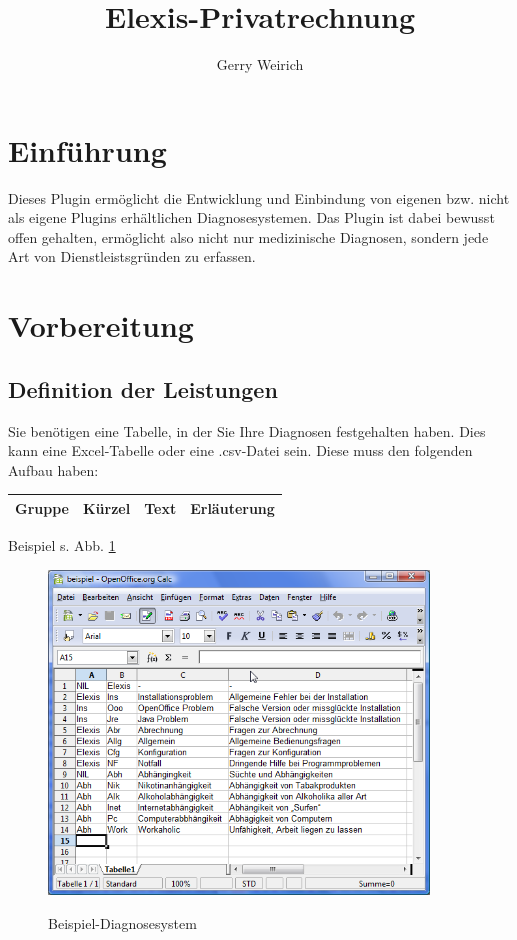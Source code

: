 \documentclass[a4paper]{scrartcl}
\begin{document}
\title{Elexis-Privatrechnung}
\author{Gerry Weirich}
\maketitle

\section{Einführung}
Dieses Plugin ermöglicht die Entwicklung und Einbindung von eigenen bzw. nicht als eigene Plugins erhältlichen Diagnosesystemen. Das Plugin ist dabei bewusst offen gehalten, ermöglicht also nicht nur medizinische Diagnosen, sondern jede Art von Dienstleistsgründen zu erfassen.

\section{Vorbereitung}
\subsection{Definition der Leistungen}
Sie benötigen eine Tabelle, in der Sie Ihre Diagnosen festgehalten haben. Dies kann eine Excel-Tabelle oder eine .csv-Datei sein. Diese muss den folgenden Aufbau haben:
\medskip
\begin{tabular}[h]{|r|r|r|r|}
\hline Gruppe & Kürzel & Text & Erläuterung\\
\hline
\end{tabular}

\medskip
Beispiel s. Abb. \ref{fig:diag}
\begin{figure}
  \includegraphics[width=0.9\textwidth]{diagnose_1}\\
  \caption{Beispiel-Diagnosesystem}\label{fig:diag}
\end{figure}
\end{document}
